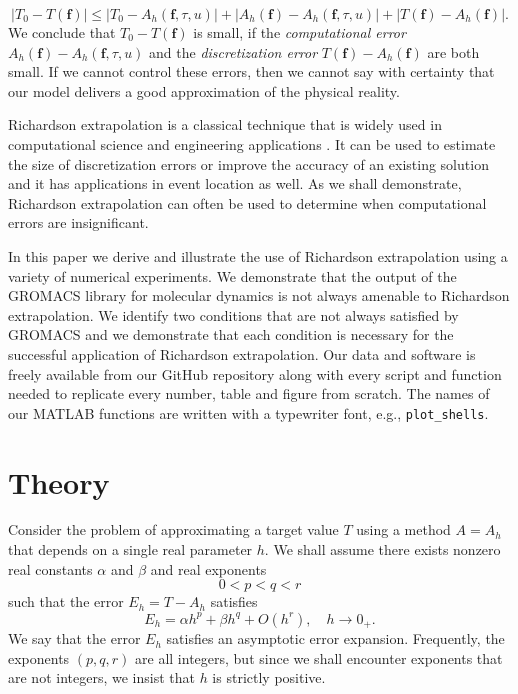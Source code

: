 \documentclass[runningheads]{llncs}
\begin{document}
\begin{equation}
  |T_0 - T(\bm{f}) | \leq  |T_0 - A_h(\bm{f},\tau,u)| + |A_h(\bm{f}) - A_h(\bm{f},\tau,u)| + |T(\bm{f}) - A_h(\bm{f})|.
\end{equation}
We conclude that $T_0 - T(\bm{f})$ is small, if the \emph{computational error} $A_h(\bm{f}) - A_h(\bm{f}, \tau, u)$ and the \emph{discretization error} $T(\bm{f}) - A_h(\bm{f})$ are both small. If we cannot control these errors, then we cannot say with certainty that our model delivers a good approximation of the physical reality.

Richardson extrapolation is a classical technique that is widely used in computational science and engineering applications \cite{roache1998}. It can be used to estimate the size of discretization errors or improve the accuracy of an existing solution \cite{zahari2018} and it has applications in event location \cite{mannshardt1978one} as well. As we shall demonstrate, Richardson extrapolation can often be used to determine when computational errors are insignificant.

In this paper we derive and illustrate the use of Richardson extrapolation using a variety of numerical experiments.
We demonstrate that the output of the GROMACS \cite{gromacs2005} library for molecular dynamics is not always amenable to Richardson extrapolation. 
We identify two conditions that are not always satisfied by GROMACS and we demonstrate that each condition is necessary for the successful application of Richardson extrapolation.
Our data and software is freely available from our GitHub \cite{lorien2024ppam} repository along with every script and function needed to replicate every number, table and figure from scratch. The names of our MATLAB functions are written with a typewriter font, e.g., \texttt{plot\_shells}.

\section{Theory}

Consider the problem of approximating a target value $T$ using a method $A = A_h$ that depends on a single real parameter $h$. We shall assume there exists nonzero real constants $\alpha$ and $\beta$ and real exponents
\begin{equation}
  0 < p < q < r
\end{equation}
such that the error $E_h = T - A_h$ satisfies
\begin{equation} \label{equ:aex}
  E_h  = \alpha h^p + \beta h^q + O(h^r), \quad h \rightarrow 0_+.
\end{equation}
We say that the error $E_h$ satisfies an asymptotic error expansion. Frequently, the exponents $(p,q,r)$ are all integers, but since we shall encounter exponents that are not integers, we insist that $h$ is strictly positive.
\end{document}
